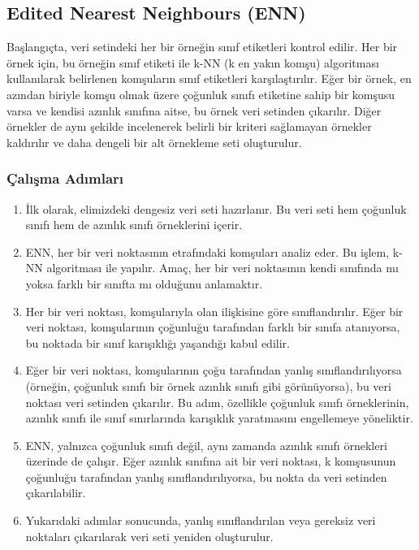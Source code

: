 \newpage

\subsection{Edited Nearest Neighbours (ENN)}
Başlangıçta, veri setindeki her bir örneğin sınıf etiketleri kontrol edilir. Her bir örnek için, bu örneğin sınıf etiketi ile k-NN (k en yakın komşu) algoritması kullanılarak belirlenen komşuların sınıf etiketleri karşılaştırılır. Eğer bir örnek, en azından biriyle komşu olmak üzere çoğunluk sınıfı etiketine sahip bir komşusu varsa ve kendisi azınlık sınıfına aitse, bu örnek veri setinden çıkarılır. Diğer örnekler de aynı şekilde incelenerek belirli bir kriteri sağlamayan örnekler kaldırılır ve daha dengeli bir alt örnekleme seti oluşturulur.

\subsubsection{Çalışma Adımları}

\begin{enumerate}
    \item İlk olarak, elimizdeki dengesiz veri seti hazırlanır. Bu veri seti hem çoğunluk sınıfı hem de azınlık sınıfı örneklerini içerir.
    \item ENN, her bir veri noktasının etrafındaki komşuları analiz eder. Bu işlem, k-NN algoritması ile yapılır. Amaç, her bir veri noktasının kendi sınıfında mı yoksa farklı bir sınıfta mı olduğunu anlamaktır.
    \item Her bir veri noktası, komşularıyla olan ilişkisine göre sınıflandırılır. Eğer bir veri noktası, komşularının çoğunluğu tarafından farklı bir sınıfa atanıyorsa, bu noktada bir sınıf karışıklığı yaşandığı kabul edilir.
    \item Eğer bir veri noktası, komşularının çoğu tarafından yanlış sınıflandırılıyorsa (örneğin, çoğunluk sınıfı bir örnek azınlık sınıfı gibi görünüyorsa), bu veri noktası veri setinden çıkarılır. Bu adım, özellikle çoğunluk sınıfı örneklerinin, azınlık sınıfı ile sınıf sınırlarında karışıklık yaratmasını engellemeye yöneliktir.
    \item ENN, yalnızca çoğunluk sınıfı değil, aynı zamanda azınlık sınıfı örnekleri üzerinde de çalışır. Eğer azınlık sınıfına ait bir veri noktası, k komşusunun çoğunluğu tarafından yanlış sınıflandırılıyorsa, bu nokta da veri setinden çıkarılabilir.
    \item Yukarıdaki adımlar sonucunda, yanlış sınıflandırılan veya gereksiz veri noktaları çıkarılarak veri seti yeniden oluşturulur.
\end{enumerate}

